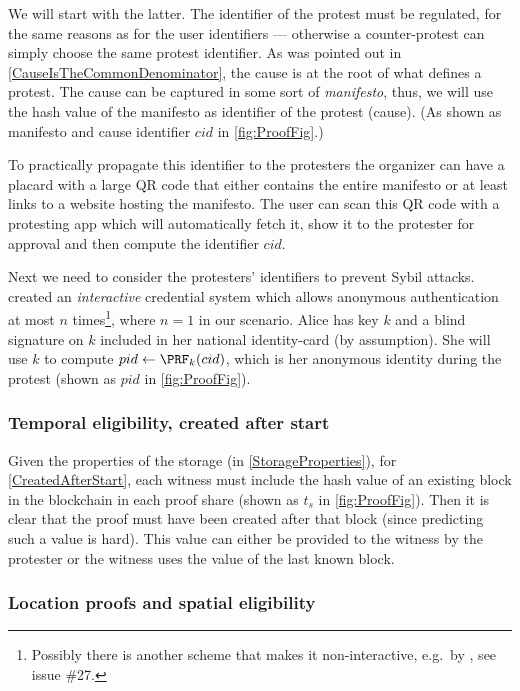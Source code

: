 We will start with the latter.
The identifier of the protest must be regulated, for the same reasons as for the 
user identifiers --- otherwise a counter-protest can simply choose the same 
protest identifier.
As was pointed out in \cref{CauseIsTheCommonDenominator}, the cause is at the 
root of what defines a protest.
The cause can be captured in some sort of \emph{manifesto}, thus, we will use 
the hash value of the manifesto as identifier of the protest (cause).
(As shown as manifesto and cause identifier \(cid\) in \cref{fig:ProofFig}.)

To practically propagate this identifier to the protesters the organizer can 
have a placard with a large QR code that either contains the entire manifesto or 
at least links to a website hosting the manifesto.
The user can scan this QR code with a protesting app which will automatically 
fetch it, show it to the protester for approval and then compute the identifier 
\(cid\).

Next we need to consider the protesters' identifiers to prevent Sybil attacks.
 created an \emph{interactive} credential system 
which allows anonymous authentication at most \(n\) times\footnote{%
  Possibly there is another scheme that makes it non-interactive, e.g.\ by 
  \citet{Psignatures}, see issue \#27.
}, where \(n = 1\) in our scenario.
Alice has  key \(k\) and a blind signature on \(k\) included in her 
national identity-card (by assumption).
She will use \(k\) to compute \(pid\gets \PRF_k(cid)\), which is her anonymous 
identity during the protest (shown as \(pid\) in \cref{fig:ProofFig}).

\subsubsection{Temporal eligibility, created after start}

Given the properties of the storage (in \cref{StorageProperties}), for 
\cref{CreatedAfterStart}, each witness must include the hash value of an 
existing block in the blockchain in each proof share (shown as \(t_s\) in 
\cref{fig:ProofFig}).
Then it is clear that the proof must have been created after that block (since 
predicting such a value is hard).
This value can either be provided to the witness by the protester or the witness 
uses the value of the last known block.

\subsubsection{Location proofs and spatial eligibility}

